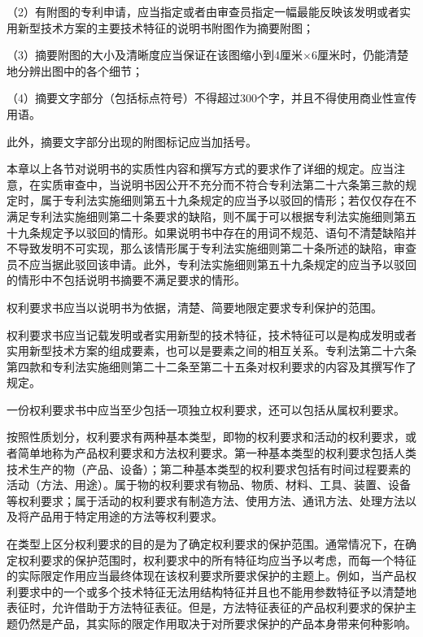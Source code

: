 {\setlength{\parindent}{17.1bp}（2）有附图的专利申请，应当指定或者由审查员指定一幅最能反映该发明或者实用新型技术方案的主要技术特征的说明书附图作为摘要附图；\par}

{\setlength{\parindent}{17.1bp}（3）摘要附图的大小及清晰度应当保证在该图缩小到4厘米×6厘米时，仍能清楚地分辨出图中的各个细节；\par}

{\setlength{\parindent}{17.1bp}（4）摘要文字部分（包括标点符号）不得超过300个字，并且不得使用商业性宣传用语。\par}

此外，摘要文字部分出现的附图标记应当加括号。

本章以上各节对说明书的实质性内容和撰写方式的要求作了详细的规定。应当注意，在实质审查中，当说明书因公开不充分而不符合专利法第二十六条第三款的规定时，属于专利法实施细则第五十九条规定的应当予以驳回的情形；若仅仅存在不满足专利法实施细则第二十条要求的缺陷，则不属于可以根据专利法实施细则第五十九条规定予以驳回的情形。如果说明书中存在的用词不规范、语句不清楚缺陷并不导致发明不可实现，那么该情形属于专利法实施细则第二十条所述的缺陷，审查员不应当据此驳回该申请。此外，专利法实施细则第五十九条规定的应当予以驳回的情形中不包括说明书摘要不满足要求的情形。

权利要求书应当以说明书为依据，清楚、简要地限定要求专利保护的范围。

权利要求书应当记载发明或者实用新型的技术特征，技术特征可以是构成发明或者实用新型技术方案的组成要素，也可以是要素之间的相互关系。专利法第二十六条第四款和专利法实施细则第二十二条至第二十五条对权利要求的内容及其撰写作了规定。

一份权利要求书中应当至少包括一项独立权利要求，还可以包括从属权利要求。

按照性质划分，权利要求有两种基本类型，即物的权利要求和活动的权利要求，或者简单地称为产品权利要求和方法权利要求。第一种基本类型的权利要求包括人类技术生产的物（产品、设备）；第二种基本类型的权利要求包括有时间过程要素的活动（方法、用途）。属于物的权利要求有物品、物质、材料、工具、装置、设备等权利要求；属于活动的权利要求有制造方法、使用方法、通讯方法、处理方法以及将产品用于特定用途的方法等权利要求。

在类型上区分权利要求的目的是为了确定权利要求的保护范围。通常情况下，在确定权利要求的保护范围时，权利要求中的所有特征均应当予以考虑，而每一个特征的实际限定作用应当最终体现在该权利要求所要求保护的主题上。例如，当产品权利要求中的一个或多个技术特征无法用结构特征并且也不能用参数特征予以清楚地表征时，允许借助于方法特征表征。但是，方法特征表征的产品权利要求的保护主题仍然是产品，其实际的限定作用取决于对所要求保护的产品本身带来何种影响。

